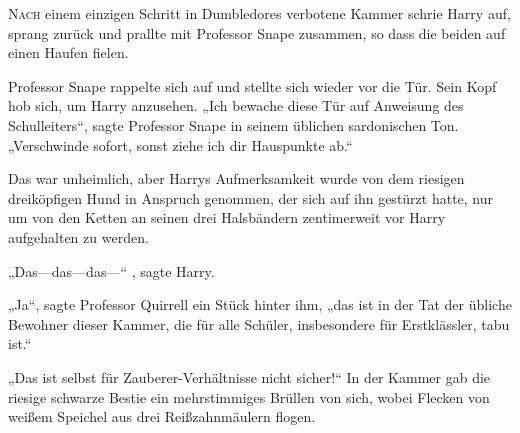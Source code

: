 
\lettrine{N}{ach} einem einzigen Schritt in Dumbledores verbotene Kammer schrie Harry auf, sprang zurück und prallte mit Professor Snape zusammen, so dass die beiden auf einen Haufen fielen.

Professor Snape rappelte sich auf und stellte sich wieder vor die Tür. Sein Kopf hob sich, um Harry anzusehen.
„Ich bewache diese Tür auf Anweisung des Schulleiters“, sagte Professor Snape in seinem üblichen sardonischen Ton. „Verschwinde sofort, sonst ziehe ich dir Hauspunkte ab.“

Das war unheimlich, aber Harrys Aufmerksamkeit wurde von dem riesigen dreiköpfigen Hund in Anspruch genommen, der sich auf ihn gestürzt hatte, nur um von den Ketten an seinen drei Halsbändern zentimerweit vor Harry aufgehalten zu werden.

„Das—das—das—“ , sagte Harry.

„Ja“, sagte Professor Quirrell ein Stück hinter ihm, „das ist in der Tat der übliche Bewohner dieser Kammer, die für alle Schüler, insbesondere für Erstklässler, tabu ist.“

„Das ist selbst für Zauberer-Verhältnisse nicht sicher!“ In der Kammer gab die riesige schwarze Bestie ein mehrstimmiges Brüllen von sich, wobei Flecken von weißem Speichel aus drei Reißzahnmäulern flogen.

